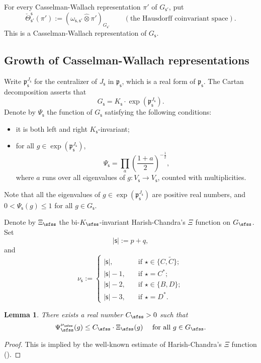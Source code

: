 \documentclass[12pt,a4paper]{amsart}
\def\abs#1{\left|{#1}\right|}
\newcommand{\p}{\mathfrak p}
\numberwithin{equation}{section}
\newtheorem{lem}[thm]{Lemma}
\theoremstyle{remark}
\begin{document}
 For every Casselman-Wallach representation $\pi'$ of $G_{\mathsf s'}$, 
put
\[
   \check \Theta_{\mathsf s'}^{\mathsf s}(\pi'):=(\omega_{\mathsf s, \mathsf s'}\widehat \otimes \pi')_{G_{\mathsf s'}} \qquad (\textrm{the  Hausdorff coinvariant space}).
\]
This is a Casselman-Wallach representation of $G_{\mathsf s}$. 



\subsection{Growth of Casselman-Wallach representations}

Write $\p_\mathsf s^{J_\mathsf s}$ for the centralizer of $J_\mathsf s$ in $\p_\mathsf s$, which is a real form of $\p_\mathsf s$. The Cartan decomposition asserts that 
\[
  G_\mathsf s=K_\mathsf s\cdot \exp(\p_\mathsf s^{J_\mathsf s}). 
\]
Denote by  $\Psi_\mathsf s$ the function of $G_\mathsf s$ satisfying the following conditions:
\begin{itemize}
\item it is both left and right $K_\mathsf s$-invariant;
\item for all $g\in \exp(\p_\mathsf s^{J_\mathsf s})$, 
\[
  \Psi_\mathsf s=\prod_{a} \left(\frac{1+a}{2}\right)^{-\frac{1}{2}},
\]
 where $a$ runs over all eigenvalues of $g: V_\mathsf s\rightarrow V_\mathsf s$, counted with multiplicities. 
\end{itemize}
Note that all the  eigenvalues of $g \in \exp(\p_\mathsf s^{J_\mathsf s})$ are positive real numbers, and  $0<\Psi_\mathsf s(g)\leq 1$ for all $g\in G_\mathsf s$. 

Denote by $\Xi_\sfss$ the bi-$K_\sfss$-invariant Harish-Chandra's $\Xi$ function on $G_\sfss$. 
Set 
\[
\abs{\mathsf s}:=p+q,
\]
 and 
\[
  \nu_\mathsf s:=\begin{cases}
    \abs{\mathsf s},\quad &\textrm{if }\star\in \{C, \widetilde C\};\\
     \abs{\mathsf s}-1,\quad & \textrm{if }\star= C^*;\\
      \abs{\mathsf s}-2,\quad & \textrm{if }\star\in \{B,D\};\\
       \abs{\mathsf s}-3,\quad & \textrm{if }\star= D^*.
  \end{cases}
\]

\begin{lem}\label{boundpsi}
There exists a real number $C_\sfss>0$ such that 
\[
  \Psi_\sfss^{\nu_\sfss}(g)\leq C_\sfss\cdot \Xi_\sfss (g)\quad\textrm{ for all $g\in G_\sfss$}.
\]

\end{lem}
\begin{proof}
This is implied by the well-known  estimate of Harish-Chandra's $\Xi$ function (\cite[Theorem 4.5.3]{Wa1}). 
\end{proof}
\end{document}
